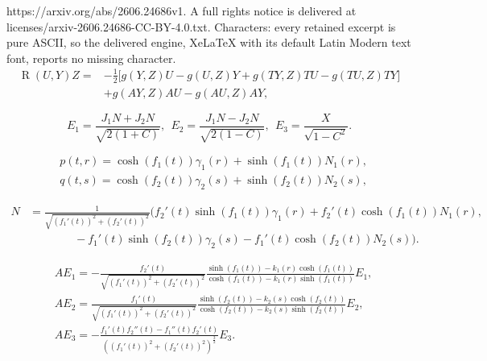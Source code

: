 \documentclass[10pt,a4paper]{amsart}
\begin{document}
https://arxiv.org/abs/2606.24686v1. A full rights notice is delivered at licenses/arxiv-2606.24686-CC-BY-4.0.txt. Characters: every retained excerpt is pure ASCII, so the delivered engine, XeLaTeX with its default Latin Modern text font, reports no missing character.
\begin{equation}\label{eqn:2.2}
\begin{aligned}
\operatorname{R}(U, Y)Z=&-\tfrac{1}{2}\big[g(Y,Z)U-g(U,Z)Y+g(TY,Z)TU
-g(TU,Z)TY\big]\\
&+g(AY,Z)AU-g(AU,Z)AY,
\end{aligned}
\end{equation}

\begin{equation}\label{eqn:2.5}
E_1=\frac{J_1N+J_2 N}{\sqrt{2(1+C)}},\
\ E_2=\frac{J_1N-J_2 N}{\sqrt{2(1-C)}},\ \ E_3=\frac{X}{\sqrt{1-C^{2}}}.
\end{equation}

\begin{equation}\label{eqn:3.1ss1}
\begin{aligned}
&p(t,r)=\cosh(f_1(t))\gamma_1(r)+\sinh(f_1(t))N_1(r),\\
&q(t,s)=\cosh(f_2(t))\gamma_2(s)+\sinh(f_2(t))N_2(s),
\end{aligned}	
\end{equation}

\begin{equation}\label{eqn:3.3ss1}
\begin{aligned}
N&=\frac{1}{\sqrt{(f_1'(t))^2+(f_2'(t))^2}}(f_2'(t)\sinh(f_1(t))\gamma_1(r)
+f_2'(t)\cosh(f_1(t))N_1(r),\\
&\qquad \qquad -f_1'(t)\sinh(f_2(t))\gamma_2(s)
-f_1'(t)\cosh(f_2(t))N_2(s)).
\end{aligned}
\end{equation}

\begin{equation}\label{eqn:3.4ss1}
\begin{aligned}
&AE_1=-\frac{f_2'(t)}{\sqrt{(f_1'(t))^2+(f_2'(t))^2}}\frac{\sinh(f_1(t))-k_1(r)\cosh(f_1(t))}
{\cosh(f_1(t))-k_1(r)\sinh(f_1(t))}E_1,\\
&AE_2=\frac{f_1'(t)}{\sqrt{(f_1'(t))^2+(f_2'(t))^2}}\frac{\sinh(f_2(t))-k_2(s)\cosh(f_2(t))}
{\cosh(f_2(t))-k_2(s)\sinh(f_2(t))}E_2,\\
&AE_3=-\frac{f_1'(t)f_2''(t)-f_1''(t)f_2'(t)}{((f_1'(t))^2+(f_2'(t))^2)^{\frac{3}{2}}}E_3.
\end{aligned}
\end{equation}
\end{document}
